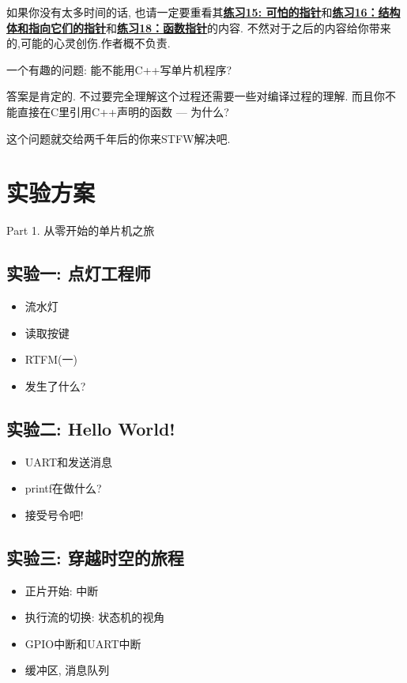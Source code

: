 如果你没有太多时间的话, 也请一定要重看其\href{https://wizardforcel.gitbooks.io/lcthw/content/ex15.html}{\textbf{练习15: 可怕的指针}}和\href{https://wizardforcel.gitbooks.io/lcthw/content/ex16.html}{\textbf{练习16：结构体和指向它们的指针}}和\href{https://wizardforcel.gitbooks.io/lcthw/content/ex18.html}{\textbf{练习18：函数指针}}的内容. 不然对于之后的内容给你带来的,可能的心灵创伤.作者概不负责.

\begin{definition}
	一个有趣的问题: 能不能用C++写单片机程序?

	答案是肯定的. 不过要完全理解这个过程还需要一些对编译过程的理解. 而且你不能直接在C里引用C++声明的函数 --- 为什么?

	这个问题就交给两千年后的你来STFW解决吧.
\end{definition}

\section{实验方案}

\Large {Part 1. 从零开始的单片机之旅} \normalsize

\subsection{实验一: 点灯工程师}
\begin{itemize}
	\item 流水灯
	\item 读取按键
	\item RTFM(一)
	\item 发生了什么?
\end{itemize}

\subsection{实验二: Hello World!}
\begin{itemize}
	\item UART和发送消息
	\item printf在做什么?
	\item 接受号令吧!
\end{itemize}

\subsection{实验三: 穿越时空的旅程}
\begin{itemize}
	\item 正片开始: 中断
	\item 执行流的切换: 状态机的视角
	\item GPIO中断和UART中断
	\item 缓冲区, 消息队列
\end{itemize}
\vspace*{20pt}

